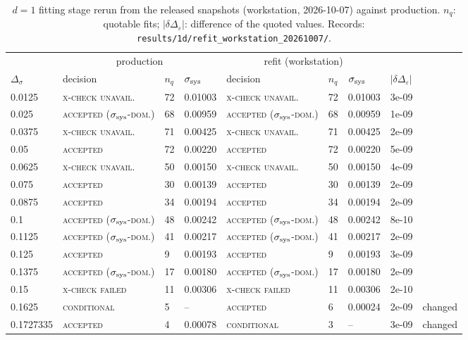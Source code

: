 \documentclass[10pt,a4paper]{article}
\newcommand{\Ds}{\Delta_\sigma}
\newcommand{\De}{\Delta_\varepsilon}
\newcommand{\code}[1]{\texttt{#1}}
\newcommand{\lbl}[1]{{\mdseries\scshape #1}}
\newcommand{\ssys}{\sigma_{\rm sys}}
\begin{document}
\begin{table}[htbp]\centering\scriptsize
\caption{$d=1$ fitting stage rerun from the released snapshots (workstation, 2026-10-07) against production. $n_q$: quotable fits;
$|\delta\De|$: difference of the quoted values. Records: \code{results/1d/refit\_workstation\_20261007/}.}\label{tab:refit}
\begin{tabular}{@{}lllllllll@{}}\toprule
 & \multicolumn{3}{c}{production} & \multicolumn{3}{c}{refit (workstation)} & & \\
$\Ds$ & decision & $n_q$ & $\ssys$ & decision & $n_q$ & $\ssys$ & $|\delta\De|$ & \\\midrule
0.0125 & \lbl{x-check unavail.} & 72 & 0.01003 & \lbl{x-check unavail.} & 72 & 0.01003 & 3e-09 &  \\
0.025 & \lbl{accepted ($\sigma_{\rm sys}$-dom.)} & 68 & 0.00959 & \lbl{accepted ($\sigma_{\rm sys}$-dom.)} & 68 & 0.00959 & 1e-09 &  \\
0.0375 & \lbl{x-check unavail.} & 71 & 0.00425 & \lbl{x-check unavail.} & 71 & 0.00425 & 2e-09 &  \\
0.05 & \lbl{accepted} & 72 & 0.00220 & \lbl{accepted} & 72 & 0.00220 & 5e-09 &  \\
0.0625 & \lbl{x-check unavail.} & 50 & 0.00150 & \lbl{x-check unavail.} & 50 & 0.00150 & 4e-09 &  \\
0.075 & \lbl{accepted} & 30 & 0.00139 & \lbl{accepted} & 30 & 0.00139 & 2e-09 &  \\
0.0875 & \lbl{accepted} & 34 & 0.00194 & \lbl{accepted} & 34 & 0.00194 & 2e-09 &  \\
0.1 & \lbl{accepted ($\sigma_{\rm sys}$-dom.)} & 48 & 0.00242 & \lbl{accepted ($\sigma_{\rm sys}$-dom.)} & 48 & 0.00242 & 8e-10 &  \\
0.1125 & \lbl{accepted ($\sigma_{\rm sys}$-dom.)} & 41 & 0.00217 & \lbl{accepted ($\sigma_{\rm sys}$-dom.)} & 41 & 0.00217 & 2e-09 &  \\
0.125 & \lbl{accepted} & 9 & 0.00193 & \lbl{accepted} & 9 & 0.00193 & 3e-09 &  \\
0.1375 & \lbl{accepted ($\sigma_{\rm sys}$-dom.)} & 17 & 0.00180 & \lbl{accepted ($\sigma_{\rm sys}$-dom.)} & 17 & 0.00180 & 2e-09 &  \\
0.15 & \lbl{x-check failed} & 11 & 0.00306 & \lbl{x-check failed} & 11 & 0.00306 & 2e-10 &  \\
0.1625 & \lbl{conditional} & 5 & -- & \lbl{accepted} & 6 & 0.00024 & 2e-09 & changed \\
0.1727335 & \lbl{accepted} & 4 & 0.00078 & \lbl{conditional} & 3 & -- & 3e-09 & changed \\

\end{tabular}
\end{table}
\end{document}
